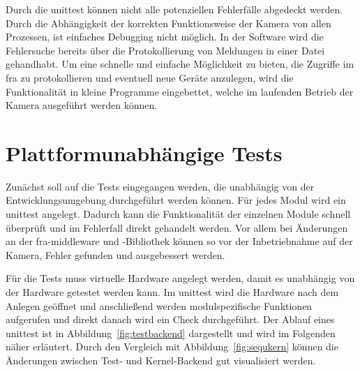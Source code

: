 Durch die \gls{unittest} können nicht alle potenziellen Fehlerfälle abgedeckt werden. Durch die Abhängigkeit der korrekten Funktionsweise der Kamera von allen Prozessen, ist einfaches Debugging nicht möglich. In der Software wird die Fehlersuche bereits über die Protokollierung von Meldungen in einer Datei gehandhabt. Um eine schnelle und einfache Möglichkeit zu bieten, die Zugriffe im \ac{fra} zu protokollieren und eventuell neue Geräte anzulegen, wird die Funktionalität in kleine Programme eingebettet, welche im laufenden Betrieb der Kamera ausgeführt werden können.



\section{Plattformunabhängige Tests}
Zunächst soll auf die Tests eingegangen werden, die unabhängig von der Entwicklungsumgebung durchgeführt werden können. Für jedes Modul wird ein \gls{unittest} angelegt. Dadurch kann die Funktionalität der einzelnen Module schnell überprüft und im Fehlerfall direkt gehandelt werden. Vor allem bei Änderungen an der \ac{fra}-\gls{middleware} und -Bibliothek können so vor der Inbetriebnahme auf der Kamera, Fehler gefunden und ausgebessert werden.


Für die Tests muss virtuelle Hardware angelegt werden, damit es unabhängig von der Hardware getestet werden kann. Im \gls{unittest} wird die Hardware nach dem Anlegen geöffnet und anschließend werden modulspezifische Funktionen aufgerufen und direkt danach wird ein Check durchgeführt. 
Der Ablauf eines \gls{unittest} ist in Abbildung~\ref{fig:testbackend} dargestellt und wird im Folgenden näher erläutert. Durch den Vergleich mit Abbildung~\ref{fig:sequkern} können die Änderungen zwischen Test- und Kernel-Backend gut visualisiert werden.


